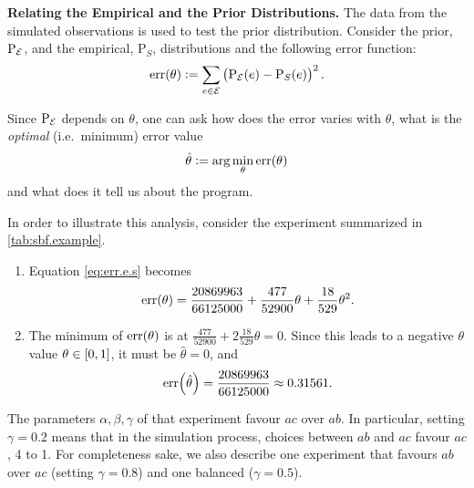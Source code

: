 \documentclass[a4paper]{article}
\newcommand{\at}[1]{\ensuremath{\!\del{#1}}}        %
\newcommand{\cla}[1]{\ensuremath{{\cal #1}}}        %
\newcommand{\EVENTSset}{\ensuremath{\cla{E}}}
\newcommand{\err}[1]{\ensuremath{\mathrm{err}\at{#1}}}
\newcommand{\prfunc}{\ensuremath{\mathrm{P}}}
\newcommand{\prd}[1]{\ensuremath{\prfunc_{#1}}}
\newcommand{\prE}{\prd{\EVENTSset}}
\begin{document}
\noindent\textbf{Relating the Empirical and the Prior Distributions.}
The data from the simulated observations is used to test the prior
distribution.  Consider the prior, \(\prE\), and the empirical,
\(\prd{S}\), distributions and the following error function:
\begin{equation}
    \err{\theta} := \sum_{e\in\EVENTSset} \del{\prE\at{e} - \prd{S}\at{e}}^2.\label{eq:err.e.s}
\end{equation}

Since \(\prE\) depends on \(\theta\), one can ask how does the error
varies with \(\theta\), what is the \emph{optimal} (i.e.\ minimum)
error value
\begin{equation}
    \hat{\theta} := \arg\min_\theta \err{\theta}\label{eq:opt.err}
\end{equation}
and what does it tell us about the program.

In order to illustrate this analysis, consider the experiment
summarized in \cref{tab:sbf.example}.

\begin{enumerate}
    \item Equation \eqref{eq:err.e.s} becomes \[
              \err{\theta} = \frac{20869963}{66125000} + \frac{477}{52900}\theta + \frac{18}{529}\theta^2.
          \]
    \item The minimum of \(\err{\theta}\) is at \(\frac{477}{52900} +
          2\frac{18}{529}\theta = 0\).  Since this leads to a negative \(\theta\) value \(\theta \in \intcc{0,1}\), it must be \(\hat{\theta} = 0\), and \[
              \err{\hat{\theta}} = \frac{20869963}{66125000} \approx 0.31561.
          \]
\end{enumerate}

The parameters \(\alpha, \beta, \gamma\) of that experiment favour
\(ac\) over \(ab\).  In particular, setting \(\gamma = 0.2\) means
that in the simulation process, choices between \(ab\) and \(ac\)
favour \(ac\), 4 to 1.  For completeness sake, we also describe one
experiment that favours \(ab\) over \(ac\) (setting \(\gamma=0.8\))
and one balanced (\(\gamma=0.5\)).
\end{document}
